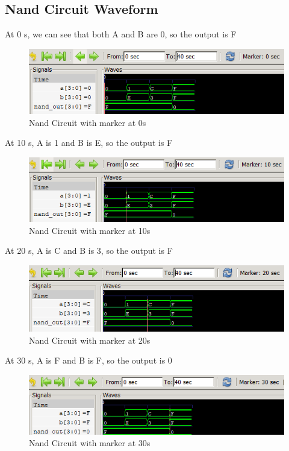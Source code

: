 \documentclass[12pt]{article}
\begin{document}
\subsection{Nand Circuit Waveform}

At 0 s, we can see that both A and B are 0, so the output is F
\begin{figure}[h]
    \centering
    \includegraphics[width = 1.0\textwidth]{figs/Nand0.png}
    \caption{Nand Circuit with marker at 0s}
    \label{fig:enter-label}
\end{figure}

At 10 s, A is 1 and B is E, so the output is F
\begin{figure}[h]
    \centering
    \includegraphics[width = 1.0\textwidth]{figs/Nand10.png}
    \caption{Nand Circuit with marker at 10s}
    \label{fig:enter-label}
\end{figure}

\newpage

At 20 s, A is C and B is 3, so the output is F
\begin{figure}[h]
    \centering
    \includegraphics[width = 1.0\textwidth]{figs/Nand20.png}
    \caption{Nand Circuit with marker at 20s}
    \label{fig:enter-label}
\end{figure}



At 30 s, A is F and B is F, so the output is 0
\begin{figure}[h]
    \centering
    \includegraphics[width = 1.0\textwidth]{figs/Nand30.png}
    \caption{Nand Circuit with marker at 30s}
    \label{fig:enter-label}
\end{figure}
\end{document}
